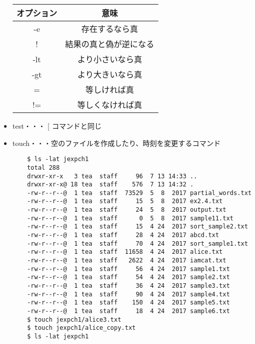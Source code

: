 \documentclass[a4paper,12pt]{jarticle}
\begin{document}
\begin{itemize}
          \clearpage
          \begin{table}[t]
              \begin{center}
                  \begin{tabular}{|c|c|} \hline
                      オプション & 意味                   \\ \hline
                      -e         & 存在するなら真         \\ \hline
                      !          & 結果の真と偽が逆になる \\ \hline
                      -lt        & より小さいなら真       \\ \hline
                      -gt        & より大きいなら真       \\ \hline
                      =          & 等しければ真           \\ \hline
                      !=         & 等しくなければ真       \\ \hline
                  \end{tabular}
              \end{center}
          \end{table}
    \item test・・・ $[$ コマンドと同じ
    \item touch・・・空のファイルを作成したり、時刻を変更するコマンド
          \begin{lstlisting}
    $ ls -lat jexpch1
    total 288
    drwxr-xr-x   3 tea  staff     96  7 13 14:33 ..
    drwxr-xr-x@ 18 tea  staff    576  7 13 14:32 .
    -rw-r--r--@  1 tea  staff  73529  5  8  2017 partial_words.txt
    -rw-r--r--@  1 tea  staff     15  5  8  2017 ex2.4.txt
    -rw-r--r--@  1 tea  staff     24  5  8  2017 output.txt
    -rw-r--r--@  1 tea  staff      0  5  8  2017 sample11.txt
    -rw-r--r--@  1 tea  staff     15  4 24  2017 sort_sample2.txt
    -rw-r--r--@  1 tea  staff     28  4 24  2017 abcd.txt
    -rw-r--r--@  1 tea  staff     70  4 24  2017 sort_sample1.txt
    -rw-r--r--@  1 tea  staff  11658  4 24  2017 alice.txt
    -rw-r--r--@  1 tea  staff   2622  4 24  2017 iamcat.txt
    -rw-r--r--@  1 tea  staff     56  4 24  2017 sample1.txt
    -rw-r--r--@  1 tea  staff     54  4 24  2017 sample2.txt
    -rw-r--r--@  1 tea  staff     36  4 24  2017 sample3.txt
    -rw-r--r--@  1 tea  staff     90  4 24  2017 sample4.txt
    -rw-r--r--@  1 tea  staff    150  4 24  2017 sample5.txt
    -rw-r--r--@  1 tea  staff     18  4 24  2017 sample6.txt
    $ touch jexpch1/alice3.txt
    $ touch jexpch1/alice_copy.txt
    $ ls -lat jexpch1

\end{lstlisting}
\end{itemize}
\end{document}
